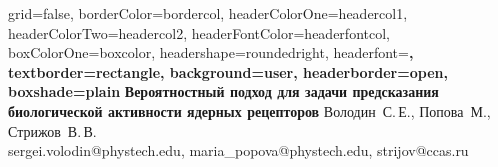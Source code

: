 \documentclass[a0paper,portrait]{baposter}
\begin{document}
\background{ %
}

\begin{poster}{
grid=false,
borderColor=bordercol, %
headerColorOne=headercol1, %
headerColorTwo=headercol2, %
headerFontColor=headerfontcol, %
boxColorOne=boxcolor, %
headershape=roundedright, %
headerfont=\Large\sf\bf, %
textborder=rectangle,
background=user,
headerborder=open, %
boxshade=plain
}
{}
%
%
{\sf\bf Вероятностный подход для задачи предсказания биологической активности ядерных рецепторов} %
{\vspace{1em} Володин~С.\,Е., Попова~М., Стрижов~В.\,В.\\ %
{\smaller sergei.volodin@phystech.edu, maria\_popova@phystech.edu, strijov@ccas.ru}} %


\end{poster}
\end{document}
